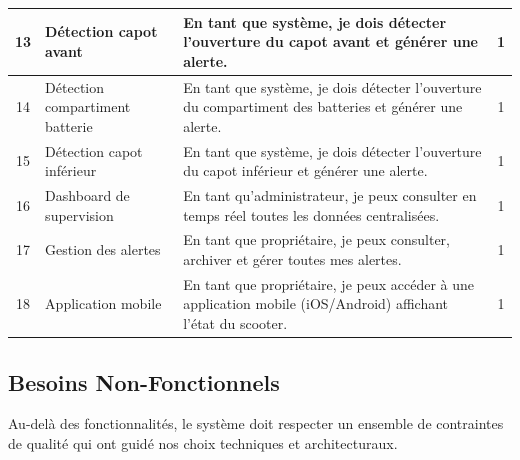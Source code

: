 \documentclass[12pt, a4paper]{report}
\begin{document}
\begin{table}[H]
\begin{tabularx}{\textwidth}{|c|p{3cm}|X|c|}
    \hline
    13 & Détection capot avant & En tant que système, je dois détecter l'ouverture du capot avant et générer une alerte. & 1 \\
    \hline
    14 & Détection compartiment batterie & En tant que système, je dois détecter l'ouverture du compartiment des batteries et générer une alerte. & 1 \\
    \hline
    15 & Détection capot inférieur & En tant que système, je dois détecter l'ouverture du capot inférieur et générer une alerte. & 1 \\
    \hline
    16 & Dashboard de supervision & En tant qu'administrateur, je peux consulter en temps réel toutes les données centralisées. & 1 \\
    \hline
    17 & Gestion des alertes & En tant que propriétaire, je peux consulter, archiver et gérer toutes mes alertes. & 1 \\
    \hline
    18 & Application mobile & En tant que propriétaire, je peux accéder à une application mobile (iOS/Android) affichant l'état du scooter. & 1 \\
    \hline
  \end{tabularx}
\end{table}

\subsection{Besoins Non-Fonctionnels}

Au-delà des fonctionnalités, le système doit respecter un ensemble de contraintes de
qualité qui ont guidé nos choix techniques et architecturaux.
\end{document}
